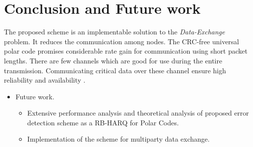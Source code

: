 \documentclass[
11pt, %
a4paper, %
oneside, %
headinclude,footinclude, %
BCOR5mm, %
]{scrartcl}
\begin{document}
\section*{Conclusion and Future work}\label{future}
The proposed scheme is an implementable solution to the \emph{Data-Exchange} problem.
It reduces the communication among nodes.
The CRC-free universal polar code promises considerable rate gain for communication using short packet lengths. 
There are few channels which are good for use during the entire transmission. Communicating critical data over these channel ensure high reliability and availability . 
\begin{itemize}
\item Future work.
\begin{itemize}
\item Extensive performance analysis and theoretical analysis of proposed error detection scheme as a RB-HARQ for Polar Codes.
\item Implementation of the scheme for multiparty data exchange.
\end{itemize}
\end{itemize}



\clearpage




\end{document}
